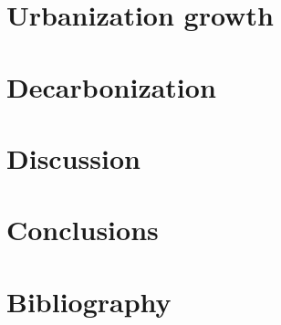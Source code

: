 \documentclass[10pt,twoside]{book}
\begin{document}
\chapter{Urbanization growth}
\clearpage


\clearpage

\chapter{Decarbonization}
\clearpage


\clearpage

\chapter{Discussion}
\clearpage

\clearpage

\chapter{Conclusions}
\clearpage


\chapter{Bibliography}
\clearpage
\begin{multicols}{2}
\printbibliography[heading=none]
\end{multicols}
\end{document}

